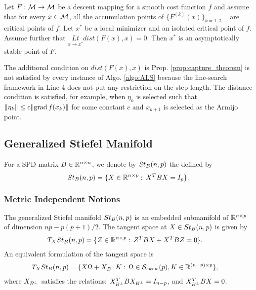 \documentclass[11pt,a4paper]{article}
\begin{document}
\begin{prop} \label{prop:capture_theorem}
Let $F:\mathcal{M}\rightarrow \mathcal{M}$ be a descent mapping for a smooth cost function $f$ and assume that for every $x\in \mathcal{M}$, all the accumulation points of $\{F^{(k)}(x)\}_{k = 1,2,\ldots}$ are critical points of $f$. Let $x^*$ be a local minimizer and an isolated critical point of $f$. Assume further that $\underset{x\rightarrow x^*}{Lt} dist(F(x),x) = 0$. Then $x^*$ is an asymptotically stable point of $F$.
\end{prop}

\begin{remark}
The additional condition on $dist(F(x),x)$ is Prop. \ref{prop:capture_theorem} is not satisfied by every instance of Algo. \ref{algo:ALS} because the line-search framework in Line 4 does not put any restriction on the step length. The distance condition is satisfied, for example, when $\eta_k$ is selected such that $\|\eta_k\|\le c\|\text{grad}\, f(x_k)\|$ for some constant $c$ and $x_{k+1}$ is selected as the Armijo point.
\end{remark}

\subsection{Generalized Stiefel Manifold}

For a SPD matrix $B\in \mathbb{R}^{n\times n}$, we denote by $St_B(n,p)$ the  defined by
\begin{equation}\label{eqn:gen_stiefel_manifold}
    St_B(n,p) = \{X\in\mathbb{R}^{n\times p}:\,X^TBX = I_p\}.
\end{equation}

\subsubsection{Metric Independent Notions}

\begin{prop}
The generalized Stiefel manifold $St_B(n,p)$ is an embedded submanifold of $\mathbb{R}^{n\times p}$ of dimension $np-p(p+1)/2$. The tangent space at $X\in St_B(n,p)$ is given by 
\begin{align}\label{eqn:tangent_space_genst_1}
T_XSt_B(n,p) &= \{Z\in\mathbb{R}^{n\times p}:\,Z^TBX + X^TBZ = 0\}.
\end{align}
An equivalent formulation of the tangent space is
\begin{align}\label{eqn:tangent_space_genst_2}
T_XSt_B(n,p) &= \{X\Omega + X_{B^\perp} K:\, \Omega \in \mathcal{S}_{skew}(p),K\in\mathbb{R}^{(n-p)\times p}\},
\end{align}
where $X_{B^\perp}$ satisfies the relations: $X_{B^\perp}^TBX_{B^\perp} = I_{n-p}$, and $X_{B^\perp}^T BX = 0$.
\end{prop}
\end{document}

